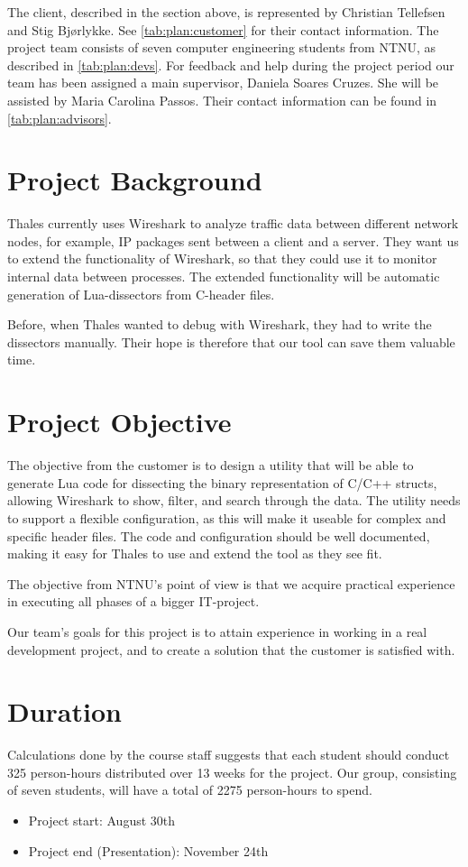 The client, described in the section above, is represented by Christian Tellefsen and Stig Bjørlykke. See \autoref{tab:plan:customer} for their contact information.
The project team consists of seven computer engineering students from NTNU, as described in \autoref{tab:plan:devs}.
For feedback and help during the project period our team has been assigned a main supervisor, Daniela Soares Cruzes.
She will be assisted by Maria Carolina Passos. Their contact information can be found in \autoref{tab:plan:advisors}.

\section{Project Background}
Thales currently uses Wireshark to analyze traffic data between different network nodes, for example, IP packages sent between a client and a server.
They want us to extend the functionality of Wireshark, so that they could use it to monitor internal data between processes. The extended functionality will be automatic generation of Lua-dissectors from C-header files.

Before, when Thales wanted to debug with Wireshark, they had to write the dissectors manually. Their hope is therefore that our tool can save them valuable time.

\section{Project Objective}
The objective from the customer is to design a utility that will be able to generate Lua code for dissecting the binary representation of C/C++ structs, allowing Wireshark to show, filter, and search through the data. The utility needs to support a flexible configuration, as this will make it useable for complex and specific header files. 
The code and configuration should be well documented, making it easy for Thales to use and extend the tool as they see fit.

The objective from NTNU's point of view is that we acquire practical experience in executing all phases of a bigger IT-project.

Our team's goals for this project is to attain experience in working in a real development project, and to create a solution that the customer
is satisfied with.

\section{Duration}
Calculations done by the course staff suggests that each student should conduct 325 person-hours distributed over 13 weeks for the project. Our group, consisting of seven students, will have a total of 2275 person-hours to spend.\\
\begin {itemize}
	\item Project start: August 30th
	\item Project end (Presentation): November 24th
\end{itemize}

